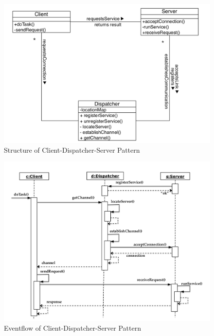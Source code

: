 \begin{figure}[H]
	\centering
	\includegraphics[width=0.8\linewidth]{images/pattern_client_dispatcher_server.png}
	\caption{Structure of Client-Dispatcher-Server Pattern}
\end{figure}
\newpage

\begin{figure}[H]
	\centering
	\includegraphics[width=0.9\linewidth]{images/eventflow_client_dispatcher_server.png}
	\caption{Eventflow of Client-Dispatcher-Server Pattern}\label{fig-server-dispatch-eventflow}
\end{figure}

